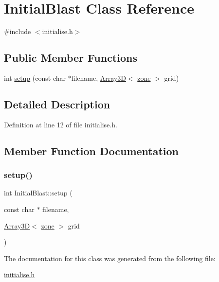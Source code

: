 \hypertarget{classInitialBlast}{}\section{Initial\+Blast Class Reference}
\label{classInitialBlast}


{\ttfamily \#include $<$initialise.\+h$>$}

\subsection*{Public Member Functions}
\begin{DoxyCompactItemize}
\item 
int \hyperlink{classInitialBlast_acf1b79c91028e044ce14c4c597cb82a2}{setup} (const char $\ast$filename, \hyperlink{classTNT_1_1Array3D}{Array3D}$<$ \hyperlink{structzone}{zone} $>$ grid)
\end{DoxyCompactItemize}


\subsection{Detailed Description}


Definition at line 12 of file initialise.\+h.



\subsection{Member Function Documentation}
\mbox{\label{classInitialBlast_acf1b79c91028e044ce14c4c597cb82a2}} 
\subsubsection{\texorpdfstring{setup()}{setup()}}
{\footnotesize\ttfamily int Initial\+Blast\+::setup (\begin{DoxyParamCaption}\item[{const char $\ast$}]{filename,  }\item[{\hyperlink{classTNT_1_1Array3D}{Array3D}$<$ \hyperlink{structzone}{zone} $>$}]{grid }\end{DoxyParamCaption})}



The documentation for this class was generated from the following file\+:\begin{DoxyCompactItemize}
\item 
\hyperlink{initialise_8h}{initialise.\+h}\end{DoxyCompactItemize}
